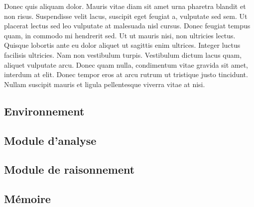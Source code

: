 Donec quis aliquam dolor. Mauris vitae diam sit amet urna pharetra blandit et non risus. Suspendisse velit lacus, suscipit eget feugiat a, vulputate sed sem. Ut placerat lectus sed leo vulputate at malesuada nisl cursus. Donec feugiat tempus quam, in commodo mi hendrerit sed. Ut ut mauris nisi, non ultricies lectus. Quisque lobortis ante eu dolor aliquet ut sagittis enim ultrices. Integer luctus facilisis ultricies. Nam non vestibulum turpis. Vestibulum dictum lacus quam, aliquet vulputate arcu. Donec quam nulla, condimentum vitae gravida sit amet, interdum at elit. Donec tempor eros at arcu rutrum ut tristique justo tincidunt. Nullam suscipit mauris et ligula pellentesque viverra vitae at nisi. 

\subsection{Environnement}



\subsection{Module d'analyse}



\subsection{Module de raisonnement}



\subsection{Mémoire}

